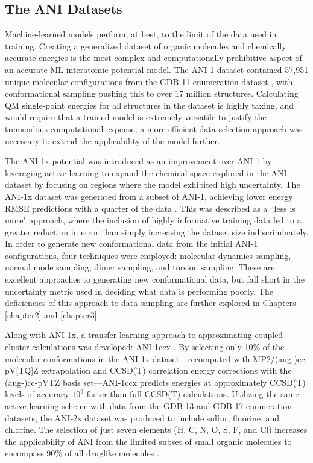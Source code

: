 \subsection{The ANI Datasets}
\label{subsec:ANI_datasets}

Machine-learned models perform, at best, to the limit of the data used in training.
Creating a generalized dataset of organic molecules and chemically accurate energies is the most complex and computationally prohibitive aspect of an accurate ML interatomic potential model.
The ANI-1 dataset \cite{ani-1_dataset} contained 57,951 unique molecular configurations from the GDB-11 enumeration dataset \cite{gdb-11-1, gdb-11-2}, with conformational sampling pushing this to over 17 million structures.
Calculating QM single-point energies for all structures in the dataset is highly taxing, and would require that a trained model is extremely versatile to justify the tremendous computational expense; a more efficient data selection approach was necessary to extend the applicability of the model further.

The ANI-1x potential \cite{ani-1x} was introduced as an improvement over ANI-1 by leveraging active learning to expand the chemical space explored in the ANI dataset by focusing on regions where the model exhibited high uncertainty. 
The ANI-1x dataset \cite{1x_1ccx_datasets} was generated from a subset of ANI-1, achieving lower energy RMSE predictions with a quarter of the data \cite{ani-1x}. 
This was described as a ``less is more" approach, where the inclusion of highly informative training data led to a greater reduction in error than simply increasing the dataset size indiscriminately.
In order to generate new conformational data from the initial ANI-1 configurations, four techniques were employed: molecular dynamics sampling, normal mode sampling, dimer sampling, and torsion sampling. 
These are excellent approaches to generating new conformational data, but fall short in the uncertainty metric used in deciding what data is performing poorly.
The deficiencies of this approach to data sampling are further explored in Chapters \ref{chapter2} and \ref{chapter3}. 

Along with ANI-1x, a transfer learning approach to approximating coupled-cluster calculations was developed: ANI-1ccx \cite{1x_1ccx_datasets}. 
By selecting only 10\% of the molecular conformations in the ANI-1x dataset---recomputed with MP2/(aug-)cc-pV[TQ]Z \cite{1ccx_ccsd(t)} extrapolation and CCSD(T) correlation energy corrections with the (aug-)cc-pVTZ \cite{1ccx_basis} basis set---ANI-1ccx predicts energies at approximately CCSD(T) levels of accuracy $10^9$ faster than full CCSD(T) calculations.
Utilizing the same active learning scheme with data from the GDB-13 \cite{gdb-13} and GDB-17 \cite{gdb-17} enumeration datasets, the ANI-2x dataset was produced to include sulfur, fluorine, and chlorine.
The selection of just seven elements (H, C, N, O, S, F, and Cl) increases the applicability of ANI from the limited subset of small organic molecules to encompass 90\% of all druglike molecules \cite{ani-2x}.

